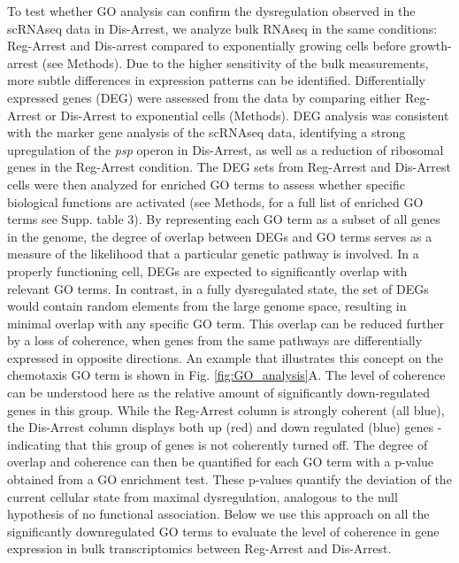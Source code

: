 \documentclass[12pt]{article}
\begin{document}
To test whether GO analysis can confirm the dysregulation observed in the scRNAseq data in Dis-Arrest, we analyze bulk RNAseq in the same conditions: Reg-Arrest and Dis-arrest compared to exponentially growing cells before growth-arrest (see Methods). Due to the higher sensitivity of the bulk measurements, more subtle differences in expression patterns can be identified. Differentially expressed genes (DEG) were assessed from the data by comparing either Reg-Arrest or Dis-Arrest to exponential cells (Methods). DEG analysis was consistent with the marker gene analysis of the scRNAseq data, identifying a strong upregulation of the \textit{psp} operon in Dis-Arrest, as well as a reduction of ribosomal genes in the Reg-Arrest condition. The DEG sets from Reg-Arrest and Dis-Arrest cells were then analyzed for enriched GO terms to assess whether specific biological functions are activated (see Methods, for a full list of enriched GO terms see Supp. table 3). By representing each GO term as a subset of all genes in the genome, the degree of overlap between DEGs and GO terms serves as a measure of the likelihood that a particular genetic pathway is involved. In a properly functioning cell, DEGs are expected to significantly overlap with relevant GO terms. In contrast, in a fully dysregulated state, the set of DEGs would contain random elements from the large genome space, resulting in minimal overlap with any specific GO term. This overlap can be reduced further by a loss of coherence, when genes from the same pathways are differentially expressed in opposite directions. An example that illustrates this concept on the chemotaxis GO term is shown in Fig. \ref{fig:GO_analysis}A. The level of coherence can be understood here as the relative amount of significantly down-regulated genes in this group. While the Reg-Arrest column is strongly coherent (all blue), the Dis-Arrest column displays both up (red) and down regulated (blue) genes - indicating that this group of genes is not coherently turned off. The degree of overlap and coherence can then be quantified for each GO term with a p-value obtained from a GO enrichment test. These p-values quantify the deviation of the current cellular state from maximal dysregulation, analogous to the null hypothesis of no functional association. Below we use this approach on all the significantly downregulated GO terms to evaluate the level of coherence in gene expression in bulk transcriptomics between Reg-Arrest and Dis-Arrest. \par
\end{document}
